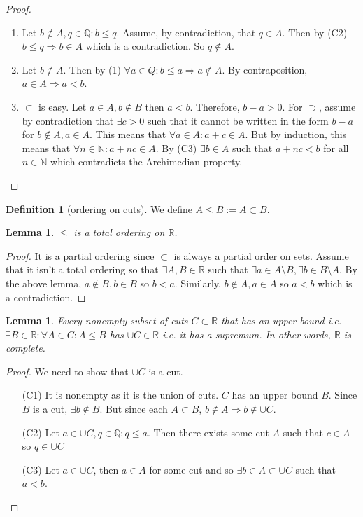 \documentclass{article}
\newcommand\N{\ensuremath{\mathbb{N}}}
\newcommand\R{\ensuremath{\mathbb{R}}}
\newcommand\Q{\ensuremath{\mathbb{Q}}}
\newtheorem{lemma}[theorem]{Lemma}
\theoremstyle{definition}
\newtheorem{definition}{Definition}[subsection]
\theoremstyle{remark}
\theoremstyle{plain}
\begin{document}
\begin{proof}
    \begin{enumerate}
        \item Let \(b \notin A, q \in \Q: b \leq q\). Assume, by contradiction, that \(q \in A\). Then by (C2) \(b \leq q \Rightarrow b \in A\) 
        which is a contradiction. So \(q \notin A\).
        \item Let \(b \notin A\). Then by (1) \(\forall a \in Q: b \leq a \Rightarrow a \notin A\). By contraposition, \(a \in A \Rightarrow a < b\).
        \item \(\subset \) is easy. Let \(a \in A, b \notin B\) then \(a < b\). Therefore, \(b-a > 0\). For \(\supset \), assume by contradiction that \(\exists c > 0\) such that
        it cannot be written in the form \(b-a\) for \(b \notin A, a \in A\). This means that \(\forall a \in A: a + c \in A\). But by induction,
        this means that \(\forall n \in \N: a + nc \in A\). By (C3) \(\exists b \in A\) such that \(a+nc < b\) for all \(n \in \N\) which contradicts 
        the Archimedian property. 
    \end{enumerate}
\end{proof}

\begin{definition}[ordering on cuts]
    We define \(A \leq B := A \subset B\).
\end{definition}
\begin{lemma}
    \(\leq\) is a total ordering on \(\R\).
\end{lemma}
\begin{proof}
    It is a partial ordering since \(\subset\) is always a partial order on sets. Assume that it isn't a total ordering so that \(\exists A,B \in \R\) such that \(\exists a \in A\setminus B, \exists b \in B\setminus A\).
    By the above lemma, \(a \notin B, b \in B\) so \(b < a\). Similarly, \(b \notin A, a \in A\) so \(a < b\) which is a contradiction.
\end{proof}

\begin{lemma}
    Every nonempty subset of cuts \(C \subset \R\) that has an upper bound i.e. \(\exists B \in \R : \forall A \in C: A \leq B\) has \(\cup C \in \R\) i.e. it has a supremum. In other words, \(\R\) is complete. 
\end{lemma}
\begin{proof}
    We need to show that \(\cup C\) is a cut.
    \begin{enumerate}
        \item[(C1)] It is nonempty as it is the union of cuts. \(C\) has an upper bound \(B\). Since \(B\) is a cut, \(\exists b \notin B\). But since each \(A\subset B\), \(b \notin A \Rightarrow b \notin \cup C\).
        \item[(C2)] Let \(a \in \cup C, q \in \Q : q \leq a\). Then there exists some cut \(A\) such that \(c \in A\) so \(q \in \cup C\)
        \item[(C3)] Let \(a \in \cup C\), then \(a \in A\) for some cut and so \(\exists b \in A \subset \cup C\) such that \(a < b\).
    \end{enumerate}
\end{proof}
\end{document}
